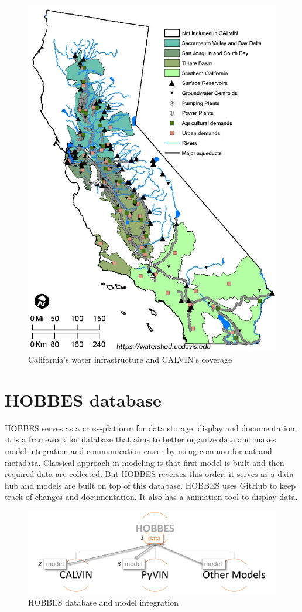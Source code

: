 \documentclass[12pt]{article}%
\begin{document}
\begin{figure}[H]
    \centering
    \includegraphics[width=0.9\linewidth]{coverage.pdf}
    \caption{California's water infrastructure and CALVIN's coverage}
    \label{fig:coverage}
\end{figure}
%
\section{HOBBES database}
%
HOBBES serves as a cross-platform for data storage, display and documentation. It is a framework for database that aims to better organize data and makes model integration and communication easier by using common format and metadata. Classical approach in modeling is that first model is built and then required data are collected. But HOBBES reverses this order; it serves as a data hub and models are built on top of this database. HOBBES uses GitHub to keep track of changes and documentation. It also has a animation tool to display data.
%
\begin{figure}[H]
    \centering
    \includegraphics[width=0.6\linewidth]{hobbes.pdf}
    \caption{HOBBES database and model integration}
    \label{fig:hobbes}
\end{figure}
%
\end{document}
